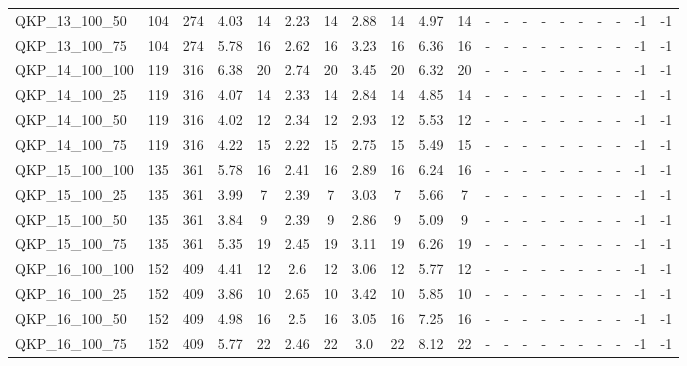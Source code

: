 \begin{sidewaystable}[!ht]
{\begin{tabular}{lcccccccccccccccccccc}
QKP\_13\_100\_50 & 104 & 274 & 4.03 & 14 &  \textcolor{blue2}{2.23} & 14 & 2.88 & 14 & 4.97 & 14 &  - &  - &  - &  - &  - &  - &  - &  - & -1 & -1 \\
QKP\_13\_100\_75 & 104 & 274 & 5.78 & 16 &  \textcolor{blue2}{2.62} & 16 & 3.23 & 16 & 6.36 & 16 &  - &  - &  - &  - &  - &  - &  - &  - & -1 & -1 \\
QKP\_14\_100\_100 & 119 & 316 & 6.38 & 20 &  \textcolor{blue2}{2.74} & 20 & 3.45 & 20 & 6.32 & 20 &  - &  - &  - &  - &  - &  - &  - &  - & -1 & -1 \\
QKP\_14\_100\_25 & 119 & 316 & 4.07 & 14 &  \textcolor{blue2}{2.33} & 14 & 2.84 & 14 & 4.85 & 14 &  - &  - &  - &  - &  - &  - &  - &  - & -1 & -1 \\
QKP\_14\_100\_50 & 119 & 316 & 4.02 & 12 &  \textcolor{blue2}{2.34} & 12 & 2.93 & 12 & 5.53 & 12 &  - &  - &  - &  - &  - &  - &  - &  - & -1 & -1 \\
QKP\_14\_100\_75 & 119 & 316 & 4.22 & 15 &  \textcolor{blue2}{2.22} & 15 & 2.75 & 15 & 5.49 & 15 &  - &  - &  - &  - &  - &  - &  - &  - & -1 & -1 \\
QKP\_15\_100\_100 & 135 & 361 & 5.78 & 16 &  \textcolor{blue2}{2.41} & 16 & 2.89 & 16 & 6.24 & 16 &  - &  - &  - &  - &  - &  - &  - &  - & -1 & -1 \\
QKP\_15\_100\_25 & 135 & 361 & 3.99 & 7 &  \textcolor{blue2}{2.39} & 7 & 3.03 & 7 & 5.66 & 7 &  - &  - &  - &  - &  - &  - &  - &  - & -1 & -1 \\
QKP\_15\_100\_50 & 135 & 361 & 3.84 & 9 &  \textcolor{blue2}{2.39} & 9 & 2.86 & 9 & 5.09 & 9 &  - &  - &  - &  - &  - &  - &  - &  - & -1 & -1 \\
QKP\_15\_100\_75 & 135 & 361 & 5.35 & 19 &  \textcolor{blue2}{2.45} & 19 & 3.11 & 19 & 6.26 & 19 &  - &  - &  - &  - &  - &  - &  - &  - & -1 & -1 \\
QKP\_16\_100\_100 & 152 & 409 & 4.41 & 12 &  \textcolor{blue2}{2.6} & 12 & 3.06 & 12 & 5.77 & 12 &  - &  - &  - &  - &  - &  - &  - &  - & -1 & -1 \\
QKP\_16\_100\_25 & 152 & 409 & 3.86 & 10 &  \textcolor{blue2}{2.65} & 10 & 3.42 & 10 & 5.85 & 10 &  - &  - &  - &  - &  - &  - &  - &  - & -1 & -1 \\
QKP\_16\_100\_50 & 152 & 409 & 4.98 & 16 &  \textcolor{blue2}{2.5} & 16 & 3.05 & 16 & 7.25 & 16 &  - &  - &  - &  - &  - &  - &  - &  - & -1 & -1 \\
QKP\_16\_100\_75 & 152 & 409 & 5.77 & 22 &  \textcolor{blue2}{2.46} & 22 & 3.0 & 22 & 8.12 & 22 &  - &  - &  - &  - &  - &  - &  - &  - & -1 & -1 \\

\end{tabular}}
\end{sidewaystable}
